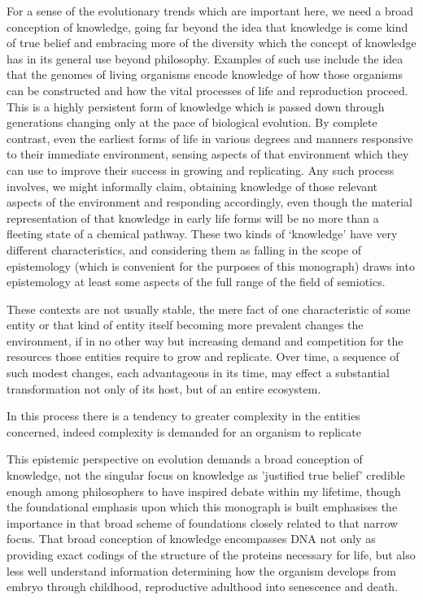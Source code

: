 For a sense of the evolutionary trends which are important here, we need a broad conception of knowledge, going far beyond the idea that knowledge is come kind of true belief and embracing more of the diversity which the concept of knowledge has in its general use beyond philosophy.
Examples of such use include the idea that the genomes of living organisms encode knowledge of how those organisms can be constructed and how the vital processes of life and reproduction proceed.
This is a highly persistent form of knowledge which is passed down through generations changing only at the pace of biological evolution.
By complete contrast, even the earliest forms of life in various degrees and manners responsive to their immediate environment, sensing aspects of that environment which they can use to improve their success in growing and replicating.
Any such process involves, we might informally claim, obtaining knowledge of those relevant aspects of the environment and responding accordingly, even though the material representation of that knowledge in early life forms will be no more than a fleeting state of a chemical pathway.
These two kinds of `knowledge' have very different characteristics, and considering them as falling in the scope of epistemology (which is convenient for the purposes of this monograph) draws into epistemology at least some aspects of the full range of the field of semiotics.


These contexts are not usually stable, the mere fact of one characteristic of some entity or that kind of entity itself becoming more prevalent changes the environment, if in no other way but increasing demand and competition for the resources those entities require to grow and replicate.
Over time, a sequence of such modest changes, each advantageous in its time, may effect a substantial transformation not only of its host, but of an entire ecosystem.

In this process there is a tendency to greater complexity in the entities concerned, indeed complexity is demanded for an organism to replicate



This epistemic perspective on evolution demands a broad conception of knowledge, not the singular focus on knowledge as 'justified true belief' credible enough among philosophers to have inspired debate within my lifetime, though the foundational emphasis upon which this monograph is built emphasises the importance in that broad scheme of foundations closely related to that narrow focus.
That broad conception of knowledge encompasses DNA not only as providing exact codings of the structure of the proteins necessary for life, but also less well understand information determining how the organism develops from embryo through childhood, reproductive adulthood into senescence and death.

